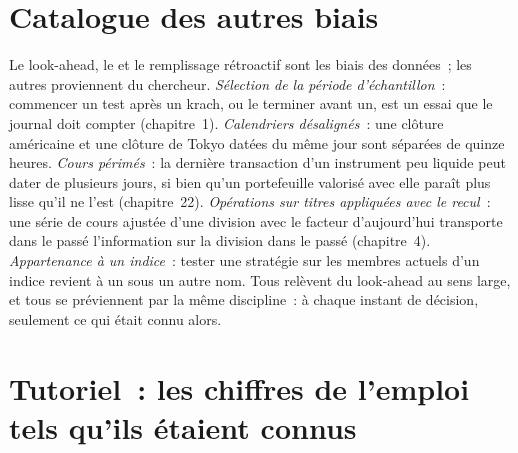 \section{Catalogue des autres biais}

Le look-ahead, le  et le remplissage rétroactif sont les biais des données~; les autres proviennent du chercheur. \emph{Sélection de la
période d'échantillon}~: commencer un test après un krach, ou le terminer avant un, est un essai que le journal doit compter (chapitre~1). \emph{Calendriers
désalignés}~: une clôture américaine et une clôture de Tokyo datées du même jour sont séparées de quinze heures. \emph{Cours périmés}~: la dernière transaction d'un instrument peu liquide
peut dater de plusieurs jours, si bien qu'un portefeuille valorisé avec elle paraît plus lisse qu'il ne l'est (chapitre~22). \emph{Opérations sur titres
appliquées avec le recul}~: une série de cours ajustée d'une division avec le facteur d'aujourd'hui transporte dans le passé l'information sur la division
dans le passé (chapitre~4). \emph{Appartenance à un indice}~: tester une stratégie sur les membres actuels d'un indice revient à un 
sous un autre nom. Tous relèvent du look-ahead au sens large, et tous se préviennent par la même discipline~: à chaque instant de décision, seulement
ce qui était connu alors.

\section{Tutoriel~: les chiffres de l'emploi tels qu'ils étaient connus}\label{tut:rs:point-in-time-data-and-the-biases:payrolls}


